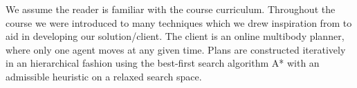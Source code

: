 We assume the reader is familiar with the course curriculum.
Throughout the course we were introduced to many techniques which we drew inspiration from to aid in developing our solution/client.
The client is an online multibody planner, where only one agent moves at any given time.
Plans are constructed iteratively in an hierarchical fashion using the best-first search algorithm A* with an admissible heuristic on a relaxed search space.~\cite{russell2009modern,geffner2013concise} 
